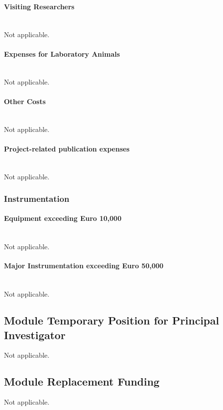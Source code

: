 \documentclass[a4paper,11pt,headings=normal]{scrartcl}
\begin{document}
\begin{itemize}
\paragraph{Visiting Researchers }\ \\
Not applicable. 

\paragraph{Expenses for Laboratory Animals}\ \\
Not applicable. 

\paragraph{Other Costs}\ \\
Not applicable. 

\paragraph{Project-related publication expenses}\ \\
Not applicable. 

	
\subsubsection{Instrumentation}
\paragraph{Equipment exceeding Euro 10,000}\ \\
Not applicable. 

\paragraph{Major Instrumentation exceeding Euro 50,000}\ \\
Not applicable. 


\subsection{Module Temporary Position for Principal Investigator}
Not applicable. 

\subsection{Module Replacement Funding}
Not applicable. 


\end{itemize}
\end{document}
